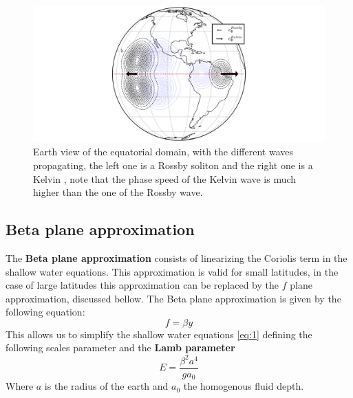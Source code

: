 \documentclass[11pt,a4paper]{report}
\begin{document}
\begin{multicols}{2}
    \begin{figure}[H]
        \hspace*{-3.8cm}\includegraphics[width=2\linewidth]{./figure/earth_view.png}
        \caption{\footnotesize{Earth view of the equatorial domain, with the different waves propagating, the left one is a Rossby soliton and the right one is a Kelvin , note that the phase speed of the Kelvin wave is much higher than the one of the Rossby wave.}}
        \label{fig:}
    \end{figure}

    \subsection{Beta plane approximation}
    The \textbf{Beta plane approximation} consists of linearizing the Coriolis term in the shallow water equations. This approximation is valid for small latitudes, in the case of large latitudes this approximation can be replaced by the $f$ plane approximation, discussed bellow.
    The Beta plane approximation is given by the following equation:
    \begin{equation*}
        f = \beta y
    \end{equation*}
    This allows us to simplify the shallow water equations \ref{eq:1} defining the following scales parameter and the \textbf{Lamb parameter} $$E = \frac{\beta^2a^4}{ga_0}$$ Where $a$ is the radius of the earth and $a_0$ the homogenous fluid depth.


\end{multicols}
\end{document}
